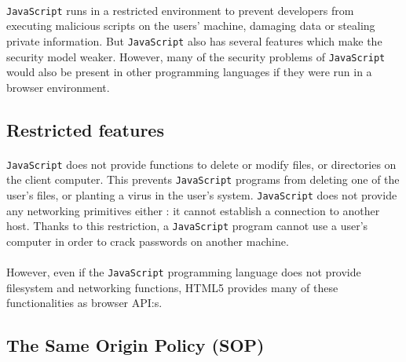 \paragraph{}
\texttt{JavaScript} runs in a restricted environment to prevent developers from executing malicious scripts on the users' machine, damaging data or stealing private information. But \texttt{JavaScript} also has several features which make the security model weaker. However, many of the security problems of \texttt{JavaScript} would also be present in other programming languages if they were run in a browser environment.

\subsection{Restricted features}

\paragraph{}
\texttt{JavaScript} does not provide functions to delete or modify files, or directories on the client computer. This prevents \texttt{JavaScript} programs from deleting one of the user's files, or planting a virus in the user's system. \texttt{JavaScript} does not provide any networking primitives either : it cannot establish a connection to another host. Thanks to this restriction, a \texttt{JavaScript} program cannot use a user's computer in order to crack passwords on another machine.

\paragraph{}
However, even if the \texttt{JavaScript} programming language does not provide filesystem and networking functions, HTML5 provides many of these functionalities as browser API:s.

\subsection{The Same Origin Policy (SOP)}

